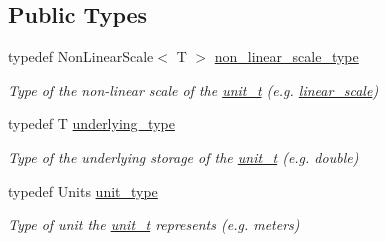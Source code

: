 \subsection*{Public Types}
\begin{DoxyCompactItemize}
\item 
\hypertarget{classunits_1_1unit__t_adb3e922bd9478c385843ee44a7607e14}{}typedef Non\+Linear\+Scale$<$ T $>$ \hyperlink{classunits_1_1unit__t_adb3e922bd9478c385843ee44a7607e14}{non\+\_\+linear\+\_\+scale\+\_\+type}\label{classunits_1_1unit__t_adb3e922bd9478c385843ee44a7607e14}

\begin{DoxyCompactList}\small\item\em Type of the non-\/linear scale of the \hyperlink{classunits_1_1unit__t}{unit\+\_\+t} (e.\+g. \hyperlink{structunits_1_1linear__scale}{linear\+\_\+scale}) \end{DoxyCompactList}\item 
\hypertarget{classunits_1_1unit__t_af3f88305faf59e0c71e8e616a2877ceb}{}typedef T \hyperlink{classunits_1_1unit__t_af3f88305faf59e0c71e8e616a2877ceb}{underlying\+\_\+type}\label{classunits_1_1unit__t_af3f88305faf59e0c71e8e616a2877ceb}

\begin{DoxyCompactList}\small\item\em Type of the underlying storage of the \hyperlink{classunits_1_1unit__t}{unit\+\_\+t} (e.\+g. double) \end{DoxyCompactList}\item 
\hypertarget{classunits_1_1unit__t_a97925b5862ffd961071a8060d0f036b3}{}typedef Units \hyperlink{classunits_1_1unit__t_a97925b5862ffd961071a8060d0f036b3}{unit\+\_\+type}\label{classunits_1_1unit__t_a97925b5862ffd961071a8060d0f036b3}

\begin{DoxyCompactList}\small\item\em Type of {\ttfamily unit} the {\ttfamily \hyperlink{classunits_1_1unit__t}{unit\+\_\+t}} represents (e.\+g. meters) \end{DoxyCompactList}\end{DoxyCompactItemize}
